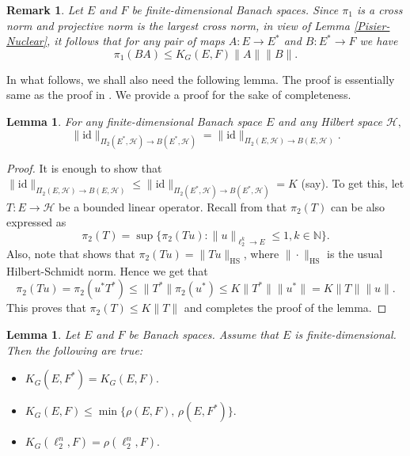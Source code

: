 \documentclass[a4paper,oneside,11pt, reqno]{amsart}
\numberwithin{equation}{section}
\newtheorem{lemma}[theorem]{Lemma}
\newtheorem{remark}[theorem]{Remark}
\theoremstyle{plain}
\begin{document}
\begin{remark}\label{gttheo}
Let $E$ and $F$ be finite-dimensional Banach spaces. Since $\pi_1$ is a cross norm and projective norm is the largest cross norm, in view of Lemma \ref{Pisier-Nuclear}, it follows that  for any pair of maps $A:E\to E^*$ and $B:E^*\to F$ we have 
\begin{equation}\label{pisier2}
 \pi_1(BA)\leqslant K_G(E,F)\|A\| \|B\|.
\end{equation}
\end{remark}
In what follows, we shall also need the following lemma. The proof is essentially same as the proof in \cite[Proposition 2.1(b)]{AFHS95}. We provide a proof for the sake of completeness.       \begin{lemma}\label{Norm of inclusion of pi-2(E,H)}
        For any finite-dimensional Banach space $E$ and any Hilbert space $\mathcal H,$ 
    \[\|\text{id}\|_{\Pi_2(E^*,\mathcal H)\to B(E^*,\mathcal H)}=\|\text{id}\|_{\Pi_2(E,\mathcal H)\to B(E,\mathcal H)}.\]
    \end{lemma}
    \begin{proof}
        It is enough to show that $\|\text{id}\|_{\Pi_2(E,\mathcal H)\to B(E,\mathcal H)} \leqslant \|\text{id}\|_{\Pi_2(E^*,\mathcal H)\to B(E^*,\mathcal H)}=K$ (say). To get this, let $T:E\to\mathcal H$ be a bounded linear operator.  
 Recall from \cite[Chapter 1]{Pisier-factorization} that $\pi_2(T)$ can be also expressed as 
\begin{equation}\label{formufrpi}
    \pi_2(T)=\sup\big\{\pi_2(Tu):\|u\|_{\ell_2^k\to E}\leqslant 1, k\in\mathbb{N}\big\}.
    \end{equation}
Also, note that \cite[Proposition 1.9]{Pisier-factorization} shows that $\pi_2(Tu)=\|Tu\|_{\text{HS}}$, where $\|
\cdot\|_{\text{HS}}$ is the usual Hilbert-Schmidt norm. Hence we get that 
\begin{equation}\label{formpi2}
\pi_2(Tu)=\pi_2(u^*T^*)\leqslant \|T^*\|\pi_2(u^*)\leqslant K\|T^*\|\|u^*\|=K\|T\|\|u\|.
\end{equation} 
This proves that $\pi_2(T)\leqslant K \|T\|$ and completes the proof of the lemma. 
    \end{proof}
\begin{lemma} \label{basic-properties-KG}
Let $E$ and $F$ be Banach spaces. Assume that $E$ is finite-dimensional. Then the following are true:
	\begin{itemize}
		\item[(i)] $K_G(E,F^*)= K_G(E,F).$
		\item[(ii)] $K_G(E,F)\leqslant \min\{\rho(E,F),\, \rho(E,F^*)\}.$
		\item[(iii)]  $K_G(\ell_2^n,F)=\rho(\ell_2^n,F).$
		\end{itemize}
\end{lemma}
\end{document}
